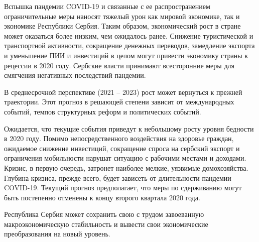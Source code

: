Вспышка пандемии COVID-19 и связанные с ее распространением ограничительные меры наносят тяжелый урон как мировой экономике, так и экономике Республики Сербия.
Таким образом, экономический рост в стране может оказаться более низким, чем ожидалось ранее.
Снижение туристической и транспортной активности, сокращение денежных переводов, замедление экспорта и уменьшение ПИИ и инвестиций в целом могут привести экономику страны к рецессии в 2020 году.
Сербские власти принимают всесторонние меры для смягчения негативных последствий пандемии.

В среднесрочной перспективе (2021 -- 2023) рост может вернуться к прежней траектории.
Этот прогноз в решающей степени зависит от международных событий, темпов структурных реформ и политических событий.

Ожидается, что текущие события приведут к небольшому росту уровня бедности в 2020 году.
Помимо непосредственного воздействия на здоровье граждан, ожидаемое снижение инвестиций, сокращение спроса на сербский экспорт и ограничения мобильности нарушат ситуацию с рабочими местами и доходами.
Кризис, в первую очередь, затронет наиболее мелкие, уязвимые домохозяйства.
Глубина кризиса, прежде всего, будет зависеть от длительности пандемии COVID-19.
Текущий прогноз предполагает, что меры по сдерживанию могут быть постепенно отменены к концу второго квартала 2020 года.

Республика Сербия может сохранить свою с трудом завоеванную макроэкономическую стабильность и вывести свои экономические преобразования на новый уровень.
